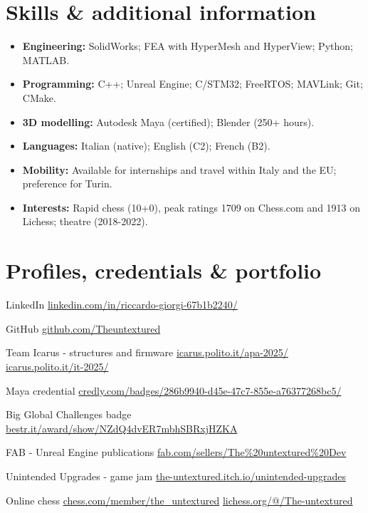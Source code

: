 \documentclass[a4paper,10pt]{article}
\begin{document}
\section*{Skills \& additional information}
\begin{itemize}
  \item \textbf{Engineering:} SolidWorks; FEA with HyperMesh and HyperView; Python; MATLAB.
  \item \textbf{Programming:} C++; Unreal Engine; C/STM32; FreeRTOS; MAVLink; Git; CMake.
  \item \textbf{3D modelling:} Autodesk Maya (certified); Blender (250+ hours).
  \item \textbf{Languages:} Italian (native); English (C2); French (B2).
  \item \textbf{Mobility:} Available for internships and travel within Italy and the EU; preference for Turin.
  \item \textbf{Interests:} Rapid chess (10+0), peak ratings 1709 on Chess.com and 1913 on Lichess; theatre (2018-2022).
\end{itemize}

\section*{Profiles, credentials \& portfolio}
\begin{cvreferences}
  \item[LinkedIn] \url{linkedin.com/in/riccardo-giorgi-67b1b2240/}
  \item[GitHub] \url{github.com/Theuntextured}
  \item[Team Icarus - structures and firmware]
    \url{icarus.polito.it/apa-2025/} \quad \url{icarus.polito.it/it-2025/}
  \item[Maya credential] \url{credly.com/badges/286b9940-d45e-47c7-855e-a76377268bc5/}
  \item[Big Global Challenges badge] \url{bestr.it/award/show/NZdQ4dvER7mbhSBRxjHZKA}
  \item[FAB - Unreal Engine publications] \url{fab.com/sellers/The%20untextured%20Dev}
  \item[Unintended Upgrades - game jam] \url{the-untextured.itch.io/unintended-upgrades}
  \item[Online chess] \url{chess.com/member/the_untextured} \quad \url{lichess.org/@/The-untextured}
\end{cvreferences}
\end{document}
